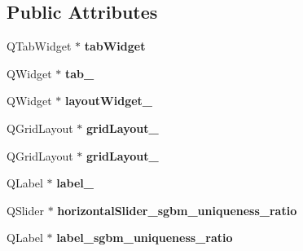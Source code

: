 \subsection*{Public Attributes}
\begin{DoxyCompactItemize}
\item 
\hypertarget{class_ui__stereo_match_param_form_abb8d877f5c25247fdea7f36c9af2f8d2}{}Q\+Tab\+Widget $\ast$ {\bfseries tab\+Widget}\label{class_ui__stereo_match_param_form_abb8d877f5c25247fdea7f36c9af2f8d2}

\item 
\hypertarget{class_ui__stereo_match_param_form_a81fa3bdc0b6ca9761fd62743b0cb0c30}{}Q\+Widget $\ast$ {\bfseries tab\+\_}\label{class_ui__stereo_match_param_form_a81fa3bdc0b6ca9761fd62743b0cb0c30}

\item 
\hypertarget{class_ui__stereo_match_param_form_a69e2547c3fd96e2c7ee9aa1cd8c706a5}{}Q\+Widget $\ast$ {\bfseries layout\+Widget\+\_}\label{class_ui__stereo_match_param_form_a69e2547c3fd96e2c7ee9aa1cd8c706a5}

\item 
\hypertarget{class_ui__stereo_match_param_form_a84a88e23bf803afdecff5bbc7a78c100}{}Q\+Grid\+Layout $\ast$ {\bfseries grid\+Layout\+\_}\label{class_ui__stereo_match_param_form_a84a88e23bf803afdecff5bbc7a78c100}

\item 
\hypertarget{class_ui__stereo_match_param_form_a6970e88ed6d533df2245580de310e50e}{}Q\+Grid\+Layout $\ast$ {\bfseries grid\+Layout\+\_}\label{class_ui__stereo_match_param_form_a6970e88ed6d533df2245580de310e50e}

\item 
\hypertarget{class_ui__stereo_match_param_form_a680c1868cec7f53a9e80ff1b83054131}{}Q\+Label $\ast$ {\bfseries label\+\_}\label{class_ui__stereo_match_param_form_a680c1868cec7f53a9e80ff1b83054131}

\item 
\hypertarget{class_ui__stereo_match_param_form_ab0163a23078a9643ec70a1a3b9de9d5f}{}Q\+Slider $\ast$ {\bfseries horizontal\+Slider\+\_\+sgbm\+\_\+uniqueness\+\_\+ratio}\label{class_ui__stereo_match_param_form_ab0163a23078a9643ec70a1a3b9de9d5f}

\item 
\hypertarget{class_ui__stereo_match_param_form_aa30957c62389918bf50f44fb44345198}{}Q\+Label $\ast$ {\bfseries label\+\_\+sgbm\+\_\+uniqueness\+\_\+ratio}\label{class_ui__stereo_match_param_form_aa30957c62389918bf50f44fb44345198}


\end{DoxyCompactItemize}
